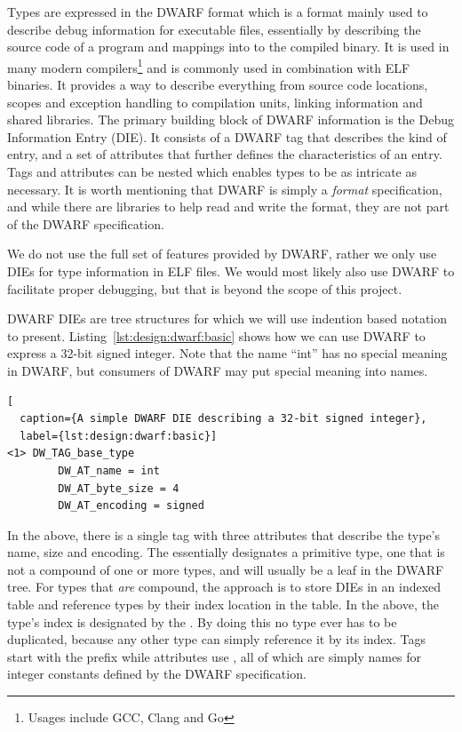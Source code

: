 Types are expressed in the DWARF format\cite{dwarf} which is a format mainly
used to describe debug information for executable files, essentially by
describing the source code of a program and mappings into to the compiled
binary. It is used in many modern compilers\footnote{Usages include GCC, Clang
  and Go} and is commonly used in combination with ELF binaries. It provides a
way to describe everything from source code locations, scopes and exception
handling to compilation units, linking information and shared libraries. The
primary building block of DWARF information is the Debug Information Entry
(DIE). It consists of a DWARF tag that describes the kind of entry, and a set of
attributes that further defines the characteristics of an entry. Tags and
attributes can be nested which enables types to be as intricate as necessary. It
is worth mentioning that DWARF is simply a \emph{format} specification, and
while there are libraries to help read and write the format, they are not part
of the DWARF specification.

We do not use the full set of features provided by DWARF, rather we only use
DIEs for type information in ELF files. We would most likely also use DWARF to
facilitate proper debugging, but that is beyond the scope of this project.

DWARF DIEs are tree structures for which we will use indention based notation to
present. Listing~\ref{lst:design:dwarf:basic} shows how we can use DWARF to
express a 32-bit signed integer. Note that the name ``int'' has no special
meaning in DWARF, but consumers of DWARF may put special meaning into names.

\begin{minipage}{\linewidth}
\begin{lstlisting}[
  caption={A simple DWARF DIE describing a 32-bit signed integer},
  label={lst:design:dwarf:basic}]
<1> DW_TAG_base_type
        DW_AT_name = int
        DW_AT_byte_size = 4
        DW_AT_encoding = signed
\end{lstlisting}
\end{minipage}

In the above, there is a single tag with three attributes that describe the
type's name, size and encoding. The  essentially
designates a primitive type, one that is not a compound of one or more types,
and will usually be a leaf in the DWARF tree. For types that \emph{are}
compound, the approach is to store DIEs in an indexed table and reference types
by their index location in the table. In the above, the type's index is
designated by the . By doing this no type ever has to be duplicated,
because any other type can simply reference it by its index. Tags start with the
 prefix while attributes use , all of which are
simply names for integer constants defined by the DWARF specification.

